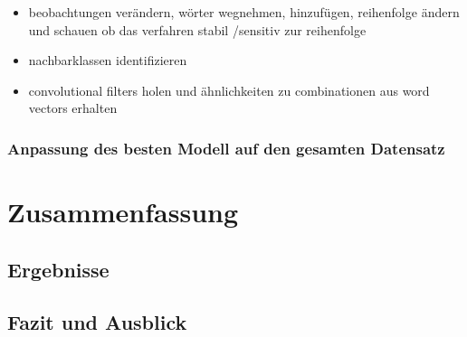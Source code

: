 \documentclass[a4paper,11pt]{article}
\begin{document}
\begin{itemize}
    \item beobachtungen verändern, wörter wegnehmen, hinzufügen, reihenfolge ändern und schauen ob das verfahren stabil /sensitiv zur reihenfolge
    \item nachbarklassen identifizieren
    \item convolutional filters holen und ähnlichkeiten zu combinationen aus word vectors erhalten
\end{itemize}{}

\subsubsection{Anpassung des besten Modell auf den gesamten Datensatz}

\section{Zusammenfassung}

\subsection{Ergebnisse}
\subsection{Fazit und Ausblick}

\newpage

\printbibliography[
heading=bibintoc,
title={Literaturverzeichnis}
]
\end{document}
